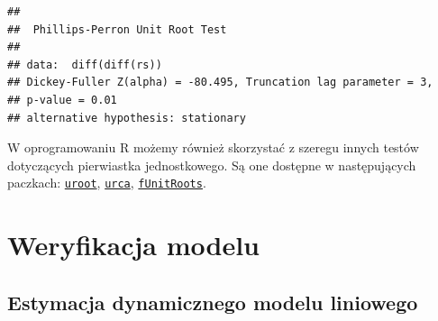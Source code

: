 \documentclass[polish,]{book}
\newenvironment{Shaded}{\begin{snugshade}}{\end{snugshade}}
\newcommand{\CommentTok}[1]{\textcolor[rgb]{0.56,0.35,0.01}{\textit{#1}}}
\newcommand{\DecValTok}[1]{\textcolor[rgb]{0.00,0.00,0.81}{#1}}
\newcommand{\KeywordTok}[1]{\textcolor[rgb]{0.13,0.29,0.53}{\textbf{#1}}}
\newcommand{\NormalTok}[1]{#1}
\newcommand{\OperatorTok}[1]{\textcolor[rgb]{0.81,0.36,0.00}{\textbf{#1}}}
\newcommand{\StringTok}[1]{\textcolor[rgb]{0.31,0.60,0.02}{#1}}
\begin{document}
\begin{verbatim}
## 
##  Phillips-Perron Unit Root Test
## 
## data:  diff(diff(rs))
## Dickey-Fuller Z(alpha) = -80.495, Truncation lag parameter = 3,
## p-value = 0.01
## alternative hypothesis: stationary
\end{verbatim}

W oprogramowaniu R możemy również skorzystać z szeregu innych testów dotyczących pierwiastka jednostkowego. Są one dostępne w następujących paczkach:
\href{https://rdrr.io/cran/uroot/}{\texttt{uroot}}, \href{https://rdrr.io/cran/urca/}{\texttt{urca}}, \href{https://rdrr.io/cran/fUnitRoots/}{\texttt{fUnitRoots}}.

\hypertarget{part_10.3}{%
\section{Weryfikacja modelu}\label{part_10.3}}

\hypertarget{part_10.3.1}{%
\subsection{Estymacja dynamicznego modelu liniowego}\label{part_10.3.1}}

\begin{Shaded}
\end{Shaded}
\end{document}
